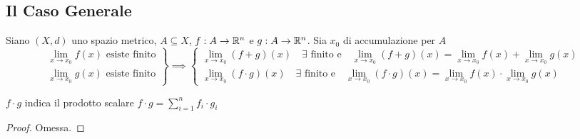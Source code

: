 \subsection{Il Caso Generale}
\begin{proposition}
	\label{prop:lim_in_R_somma_prod}
	Siano $(X,d)$ uno spazio metrico, $A \subseteq X$, $f:A \to \mathbb{R}^n$ e $g:A \to \mathbb{R}^n$. Sia $x_0$ di accumulazione per $A$
	\begin{equation*}
		\left.
		\begin{array}{r}
			\lim\limits_{x \to x_0} f(x) \text{ esiste finito}\\
			\lim\limits_{x \to x_0} g(x) \text{ esiste finito}
		\end{array}
		\right\}
		\implies
		\left\{
		\begin{array}{l}
			\lim\limits_{x \to x_0} (f + g)(x) \quad \exists \text{ finito e} \quad \lim\limits_{x \to x_0} (f + g)(x) = \lim\limits_{x \to x_0} f(x) + \lim\limits_{x \to x_0} g(x)\\
			\lim\limits_{x \to x_0} (f \cdot g)(x) \quad \exists \text{ finito e} \quad \lim\limits_{x \to x_0} (f \cdot g)(x) = \lim\limits_{x \to x_0} f(x) \cdot \lim\limits_{x \to x_0} g(x)
		\end{array}
		\right.
	\end{equation*}
	\begin{note}
		$f \cdot g$ indica il prodotto scalare $f \cdot g = \sum\limits_{i = 1}^{n} f_i \cdot g_i$
	\end{note}
	\begin{proof}
		Omessa.
	\end{proof}
\end{proposition}

